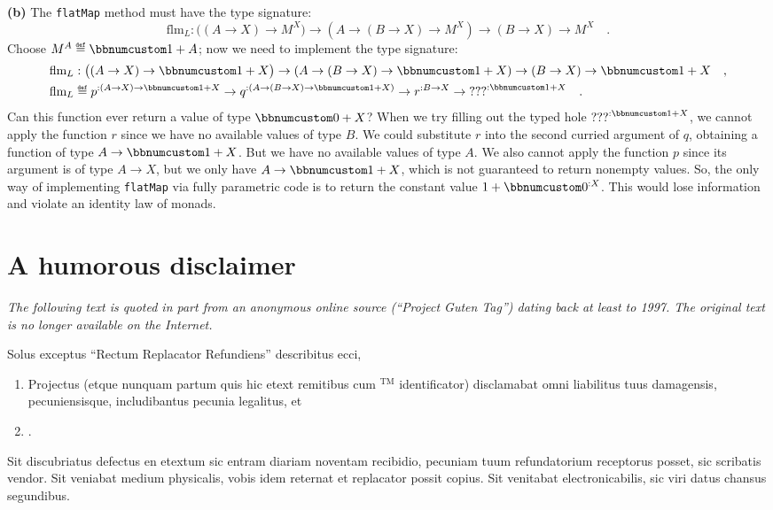 \textbf{(b)} The \lstinline!flatMap! method must have the type signature:
\[
\text{flm}_{L}:\big((A\rightarrow X)\rightarrow M^{X}\big)\rightarrow(A\rightarrow(B\rightarrow X)\rightarrow M^{X})\rightarrow(B\rightarrow X)\rightarrow M^{X}\quad.
\]
Choose $M^{A}\triangleq\bbnum 1+A$; now we need to implement the
type signature:
\begin{align*}
 & \text{flm}_{L}:\big((A\rightarrow X)\rightarrow\bbnum 1+X\big)\rightarrow\left(A\rightarrow(B\rightarrow X)\rightarrow\bbnum 1+X\right)\rightarrow(B\rightarrow X)\rightarrow\bbnum 1+X\quad,\\
 & \text{flm}_{L}\triangleq p^{:(A\rightarrow X)\rightarrow\bbnum 1+X}\rightarrow q^{:\left(A\rightarrow(B\rightarrow X)\rightarrow\bbnum 1+X\right)}\rightarrow r^{:B\rightarrow X}\rightarrow\text{???}^{:\bbnum 1+X}\quad.
\end{align*}
Can this function ever return a value of type $\bbnum 0+X$? When
we try filling out the typed hole $\text{???}^{:\bbnum 1+X}$, we
cannot apply the function $r$ since we have no available values of
type $B$. We could substitute $r$ into the second curried argument
of $q$, obtaining a function of type $A\rightarrow\bbnum 1+X$. But
we have no available values of type $A$. We also cannot apply the
function $p$ since its argument is of type $A\rightarrow X$, but
we only have $A\rightarrow\bbnum 1+X$, which is not guaranteed to
return nonempty values. So, the only way of implementing \lstinline!flatMap!
via fully parametric code is to return the constant value $1+\bbnum 0^{:X}$.
This would lose information and violate an identity law of monads.

\chapter{A humorous disclaimer}

\emph{The following text is quoted in part from an anonymous
online source (\textsf{``}Project Guten Tag\textsf{''}) dating back at least to 1997.
The original text is no longer available on the Internet.}

\medskip{}


Solus exceptus \textsf{``}Rectum Replacator Refundiens\textsf{''} describitus ecci,
\begin{enumerate}
\item Projectus (etque nunquam partum quis hic etext remitibus cum $^{\text{TM}}$ identificator) disclamabat omni liabilitus
tuus damagensis, pecuniensisque, includibantus pecunia legalitus,
et 
\item {}. 
\end{enumerate}
Sit discubriatus defectus en etextum sic entram diariam noventam recibidio,
pecuniam tuum refundatorium receptorus posset, sic scribatis vendor.
Sit veniabat medium physicalis, vobis idem reternat et replacator
possit copius. Sit venitabat electronicabilis, sic viri datus chansus
segundibus. 

